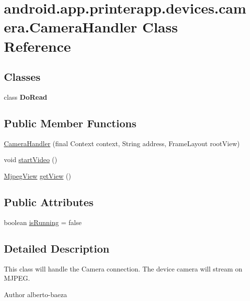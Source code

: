 \hypertarget{classandroid_1_1app_1_1printerapp_1_1devices_1_1camera_1_1_camera_handler}{}\section{android.\+app.\+printerapp.\+devices.\+camera.\+Camera\+Handler Class Reference}
\label{classandroid_1_1app_1_1printerapp_1_1devices_1_1camera_1_1_camera_handler}
\subsection*{Classes}
\begin{DoxyCompactItemize}
\item 
class {\bfseries Do\+Read}
\end{DoxyCompactItemize}
\subsection*{Public Member Functions}
\begin{DoxyCompactItemize}
\item 
\hyperlink{classandroid_1_1app_1_1printerapp_1_1devices_1_1camera_1_1_camera_handler_aeab18251a7aa40af697bd234b28e4e4c}{Camera\+Handler} (final Context context, String address, Frame\+Layout root\+View)
\item 
void \hyperlink{classandroid_1_1app_1_1printerapp_1_1devices_1_1camera_1_1_camera_handler_a90a826b2cb174d7a711344c7cc300a46}{start\+Video} ()
\item 
\hyperlink{classandroid_1_1app_1_1printerapp_1_1devices_1_1camera_1_1_mjpeg_view}{Mjpeg\+View} \hyperlink{classandroid_1_1app_1_1printerapp_1_1devices_1_1camera_1_1_camera_handler_a5929bac8831a5477549b036a5192d939}{get\+View} ()
\end{DoxyCompactItemize}
\subsection*{Public Attributes}
\begin{DoxyCompactItemize}
\item 
boolean \hyperlink{classandroid_1_1app_1_1printerapp_1_1devices_1_1camera_1_1_camera_handler_a2aae0d524d7286586903498239bd1d67}{is\+Running} = false
\end{DoxyCompactItemize}


\subsection{Detailed Description}
This class will handle the Camera connection. The device camera will stream on M\+J\+P\+EG. \begin{DoxyAuthor}{Author}
alberto-\/baeza 
\end{DoxyAuthor}


